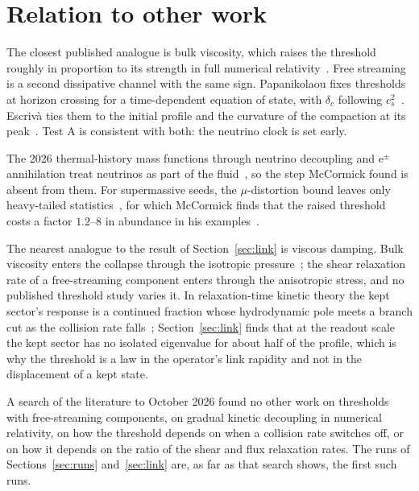 \documentclass[11pt]{article}
\begin{document}
\section{Relation to other work}

The closest published analogue is bulk viscosity, which raises the threshold roughly in proportion to its strength in full numerical relativity~\cite{Yuwen}. Free streaming is a second dissipative channel with the same sign. Papanikolaou fixes thresholds at horizon crossing for a time-dependent equation of state, with $\delta_c$ following $c_s^2$~\cite{Pap}. Escriv\`a ties them to the initial profile and the curvature of the compaction at its peak~\cite{Esc}. Test A is consistent with both: the neutrino clock is set early.

The 2026 thermal-history mass functions through neutrino decoupling and e$^\pm$ annihilation treat neutrinos as part of the fluid~\cite{Gonin}, so the step McCormick found is absent from them. For supermassive seeds, the $\mu$-distortion bound leaves only heavy-tailed statistics~\cite{Dave}, for which McCormick finds that the raised threshold costs a factor $1.2$--$8$ in abundance in his examples~\cite{McC}.

The nearest analogue to the result of Section~\ref{sec:link} is viscous damping. Bulk viscosity enters the collapse through the isotropic pressure~\cite{Yuwen}; the shear relaxation rate of a free-streaming component enters through the anisotropic stress, and no published threshold study varies it. In relaxation-time kinetic theory the kept sector's response is a continued fraction whose hydrodynamic pole meets a branch cut as the collision rate falls~\cite{Rom,Hu}; Section~\ref{sec:link} finds that at the readout scale the kept sector has no isolated eigenvalue for about half of the profile, which is why the threshold is a law in the operator's link rapidity and not in the displacement of a kept state.

A search of the literature to October 2026 found no other work on thresholds with free-streaming components, on gradual kinetic decoupling in numerical relativity, on how the threshold depends on when a collision rate switches off, or on how it depends on the ratio of the shear and flux relaxation rates. The runs of Sections~\ref{sec:runs} and~\ref{sec:link} are, as far as that search shows, the first such runs.
\end{document}
